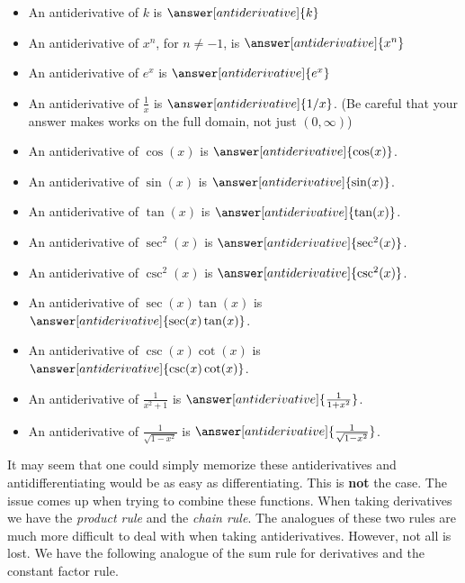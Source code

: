 \documentclass{ximera}
\begin{document}
\begin{theorem}\label{theorem:basicAnti} \hfil

\begin{question}
\begin{itemize}
\item An antiderivative of  $k$ is $\answer[antiderivative]{k}$
\item An antiderivative of $x^n$, for $n \neq -1$,  is $\answer[antiderivative]{x^n}$
\item An antiderivative of  $e^x$ is $\answer[antiderivative]{e^x}$
\item An antiderivative of  $\frac{1}{x}$ is $\answer[antiderivative]{1/x}$. (Be careful that your answer makes works on the full domain, not just $(0,\infty)$)
\item An antiderivative of $\cos(x)$ is  $\answer[antiderivative]{\cos(x)}$.
\item An antiderivative of $\sin(x)$ is $\answer[antiderivative]{\sin(x)}$.  
\item An antiderivative of $\tan(x)$ is $\answer[antiderivative]{\tan(x)}$.  
\item An antiderivative of $\sec^2(x)$ is $\answer[antiderivative]{\sec^2(x)}$. 
\item An antiderivative of $\csc^2(x)$ is $\answer[antiderivative]{\csc^2(x)}$.
\item An antiderivative of $\sec(x)\tan(x)$ is $\answer[antiderivative]{\sec(x)\tan(x)}$.
\item An antiderivative of $\csc(x)\cot(x)$ is $\answer[antiderivative]{\csc(x)\cot(x)}$.
\item An antiderivative of $\frac{1}{x^2+1}$ is $\answer[antiderivative]{\frac{1}{1+x^2}}$.
\item An antiderivative of $\frac{1}{\sqrt{1-x^2}}$ is $\answer[antiderivative]{\frac{1}{\sqrt{1-x^2}}}$.
\end{itemize}
\end{question}


\end{theorem}

It may seem that one could simply memorize these antiderivatives and
antidifferentiating would be as easy as differentiating. This is
\textbf{not} the case. The issue comes up when trying to combine these
functions.  When taking derivatives we have the \textit{product rule}
and the \textit{chain rule}. The analogues of these two rules are much
more difficult to deal with when taking antiderivatives. However, not
all is lost. We have the following analogue of the sum rule for
derivatives and the constant factor rule.
\end{document}
